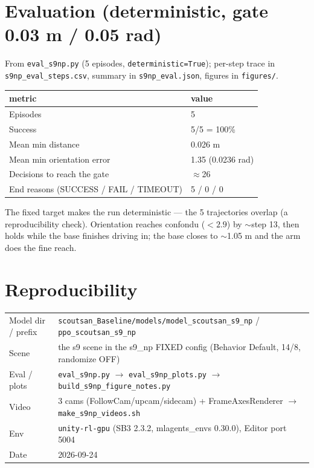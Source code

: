 \documentclass[11pt]{article}
\newcommand{\code}[1]{\texttt{#1}}
\begin{document}
\section{Evaluation (deterministic, gate 0.03 m / 0.05 rad)}
From \code{eval\_s9np.py} (5 episodes, \code{deterministic=True}); per-step trace in
\code{s9np\_eval\_steps.csv}, summary in \code{s9np\_eval.json}, figures in \code{figures/}.
\begin{center}
\begin{tabular}{ll}
\hline
metric & value\\
\hline
Episodes & 5\\
Success & 5/5 = 100\%\\
Mean min distance & 0.026 m\\
Mean min orientation error & 1.35\textdegree{} (0.0236 rad)\\
Decisions to reach the gate & $\approx$26\\
End reasons (SUCCESS / FAIL / TIMEOUT) & 5 / 0 / 0\\
\hline
\end{tabular}
\end{center}
The fixed target makes the run deterministic --- the 5 trajectories overlap (a reproducibility
check). Orientation reaches confondu ($<2.9$\textdegree) by $\sim$step 13, then holds while the
base finishes driving in; the base closes to $\sim$1.05 m and the arm does the fine reach.

\section*{Reproducibility}
\begin{tabular}{ll}
Model dir / prefix & \code{scoutsan\_Baseline/models/model\_scoutsan\_s9\_np} / \code{ppo\_scoutsan\_s9\_np}\\
Scene & the s9 scene in the s9\_np FIXED config (Behavior Default, 14/8, randomize OFF)\\
Eval / plots & \code{eval\_s9np.py} $\to$ \code{eval\_s9np\_plots.py} $\to$ \code{build\_s9np\_figure\_notes.py}\\
Video & 3 cams (FollowCam/upcam/sidecam) + FrameAxesRenderer $\to$ \code{make\_s9np\_videos.sh}\\
Env & \code{unity-rl-gpu} (SB3 2.3.2, mlagents\_envs 0.30.0), Editor port 5004\\
Date & 2026-09-24\\
\end{tabular}
\end{document}
